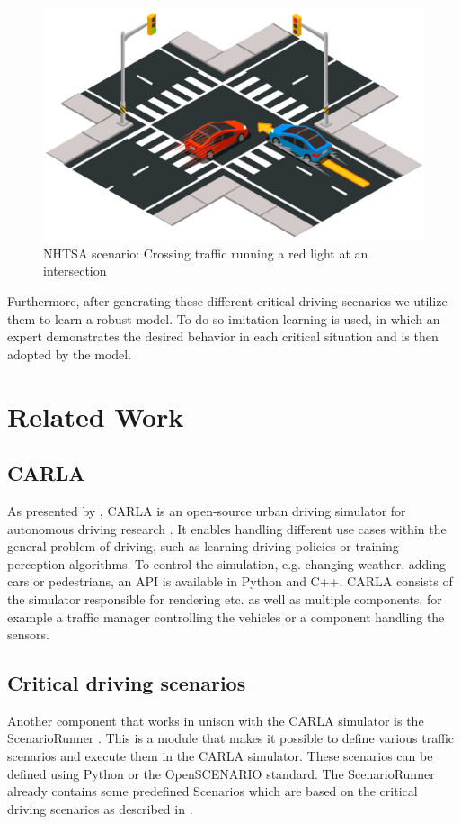 \documentclass[conference, 11pt]{IEEEtran}
\begin{document}
\begin{figure}[ht]
    \centering
    \includegraphics[width=0.7\linewidth]{figures/scenario-run_red_light.png}
    \caption{NHTSA scenario: Crossing traffic running a red light at an intersection \cite{CARLAChallenge:Scenarios}}
    \label{fig:scenario-run_red_light}
\end{figure}

Furthermore, after generating these different critical driving scenarios we utilize them to learn a robust model.
To do so imitation learning is used, in which an expert demonstrates the desired behavior in each critical situation and is then adopted by the model.

\section{Related Work}

\subsection{CARLA}
As presented by \citeauthor{Dosovitskiy17:CARLA}, CARLA is an open-source urban driving simulator for autonomous driving research \cite{Dosovitskiy17:CARLA}.
It enables handling different use cases within the general problem of driving, such as learning driving policies or training perception algorithms.
To control the simulation, e.g. changing weather, adding cars or pedestrians, an API is available in Python and C++.
CARLA consists of the simulator responsible for rendering etc. as well as multiple components, for example a traffic manager controlling the vehicles or a component handling the sensors.

\subsection{Critical driving scenarios}

Another component that works in unison with the CARLA simulator is the ScenarioRunner \cite{CARLA:ScenarioRunner}.
This is a module that makes it possible to define various traffic scenarios and execute them in the CARLA simulator.
These scenarios can be defined using Python or the OpenSCENARIO \cite{OpenScenario} standard.
The ScenarioRunner already contains some predefined Scenarios which are based on the critical driving scenarios as described in  \cite{NHTSA:PreCrashScenarios}.
\end{document}
